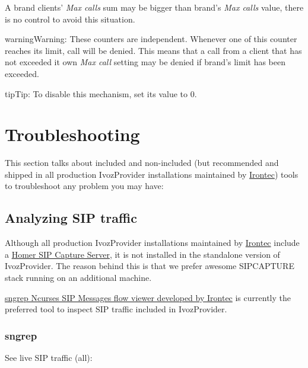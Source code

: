 \documentclass[letterpaper,10pt,english]{sphinxmanual}
\begin{document}
A brand clients' \emph{Max calls} sum may be bigger than brand's \emph{Max calls} value, there is no control to avoid this situation.

\begin{notice}{warning}{Warning:}
These counters are independent. Whenever one of this counter reaches its limit, call will be denied. This
means that a call from a client that has not exceeded it own \emph{Max call} setting may be denied if brand's
limit has been exceeded.
\end{notice}

\begin{notice}{tip}{Tip:}
To disable this mechanism, set its value to 0.
\end{notice}


\chapter{Troubleshooting}
\label{security_and_maintenance/maintenance/index::doc}\label{security_and_maintenance/maintenance/index:troubleshooting}
This section talks about included and non-included (but recommended and shipped in all production IvozProvider
installations maintained by \href{https://www.irontec.com}{Irontec}) tools to troubleshoot any problem you may have:


\section{Analyzing SIP traffic}
\label{security_and_maintenance/maintenance/sip_captures:analyzing-sip-traffic}\label{security_and_maintenance/maintenance/sip_captures::doc}
Although all production IvozProvider installations maintained by
\href{https://www.irontec.com}{Irontec} include a \href{https://www.sipcapture.org/}{Homer SIP Capture Server}, it is not installed in the standalone version
of IvozProvider. The reason behind this is that we prefer awesome SIPCAPTURE
stack running on an additional machine.

\href{https://github.com/irontec/sngrep}{sngrep Ncurses SIP Messages flow viewer developed by Irontec} is currently
the preferred tool to inspect SIP traffic included in IvozProvider.

\noindent{}


\subsection{sngrep}
\label{security_and_maintenance/maintenance/sip_captures:sngrep}
See live SIP traffic (all):
\end{document}
